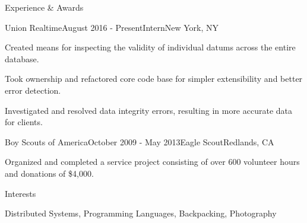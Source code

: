 \documentclass{resume} %
\begin{document}
\begin{rSection}{Experience \& Awards}

\begin{rSubsection}{Union Realtime}{August 2016 - Present}{Intern}{New York, NY}
\item Created means for inspecting the validity of individual datums across the entire database.
\item Took ownership and refactored core code base for simpler extensibility and better error detection.
\item Investigated and resolved data integrity errors, resulting in more accurate data for clients.
\end{rSubsection}




\begin{rSubsection}{Boy Scouts of America}{October 2009 - May 2013}{Eagle Scout}{Redlands, CA}
\item Organized and completed a service project consisting of over 600 volunteer hours and donations of \$4,000.
\end{rSubsection}

\end{rSection}


\begin{rSection}{Interests}

Distributed Systems, Programming Languages, Backpacking, Photography

\end{rSection}





\end{document}
